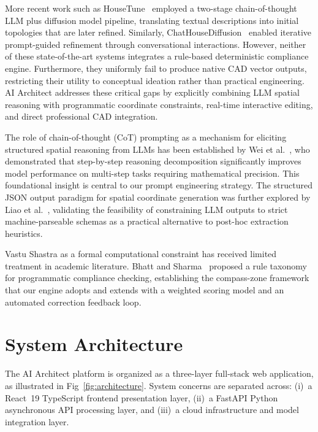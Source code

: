 \documentclass[10pt, twocolumn, letterpaper]{article}
\begin{document}
More recent work such as HouseTune~\cite{housetune} employed a two-stage
chain-of-thought LLM plus diffusion model pipeline, translating textual
descriptions into initial topologies that are later refined. Similarly,
ChatHouseDiffusion~\cite{chathousediffusion} enabled iterative prompt-guided
refinement through conversational interactions. However, neither of these
state-of-the-art systems integrates a rule-based deterministic compliance engine.
Furthermore, they uniformly fail to produce native CAD vector outputs,
restricting their utility to conceptual ideation rather than practical engineering.
AI Architect addresses these critical gaps by explicitly combining LLM spatial
reasoning with programmatic coordinate constraints, real-time interactive
editing, and direct professional CAD integration.

The role of chain-of-thought (CoT) prompting as a mechanism for eliciting
structured spatial reasoning from LLMs has been established by Wei et
al.~\cite{cot_prompting}, who demonstrated that step-by-step reasoning
decomposition significantly improves model performance on multi-step tasks
requiring mathematical precision. This foundational insight is central to
our prompt engineering strategy. The structured JSON output paradigm for
spatial coordinate generation was further explored by Liao et
al.~\cite{json_structured_output}, validating the feasibility of constraining
LLM outputs to strict machine-parseable schemas as a practical alternative
to post-hoc extraction heuristics.

Vastu Shastra as a formal computational constraint has received limited
treatment in academic literature. Bhatt and Sharma~\cite{vastu_computational}
proposed a rule taxonomy for programmatic compliance checking, establishing
the compass-zone framework that our engine adopts and extends with a weighted
scoring model and an automated correction feedback loop.

\section{System Architecture}

The AI Architect platform is organized as a three-layer full-stack web
application, as illustrated in Fig~\ref{fig:architecture}. System concerns
are separated across: (i)~a React~19 TypeScript frontend presentation layer,
(ii)~a FastAPI Python asynchronous API processing layer, and (iii)~a cloud
infrastructure and model integration layer.
\end{document}
